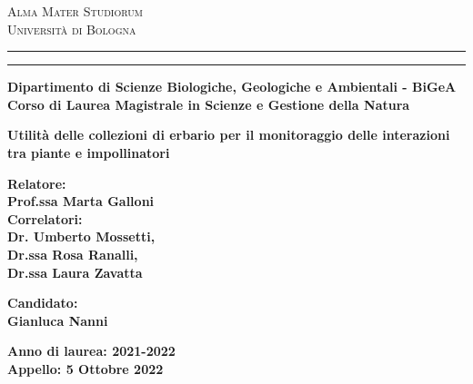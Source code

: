 \documentclass[a4paper,12pt]{article}
\begin{document}
\begin{titlepage}
\begin{center}
{{\Large{\textsc{Alma Mater Studiorum
\\
\medskip
Universit\`a di Bologna}}}} 
\rule[0.1cm]{14cm}{0.1mm}
\rule[0.5cm]{14cm}{0.6mm}
{\small{\bf Dipartimento di Scienze Biologiche, Geologiche e Ambientali - BiGeA\\
Corso di Laurea Magistrale in Scienze e Gestione della Natura}}
\end{center}
\vspace{30mm}
\begin{center}
{\LARGE{\bf Utilità delle collezioni di erbario per il monitoraggio delle interazioni tra piante e impollinatori}}\\
\vspace{3mm}
\end{center}
\vspace{40mm}
\par
\noindent
\begin{minipage}[t]{0.47\textwidth}
{\normalsize{\bf Relatore:\\
Prof.ssa Marta Galloni}}\vspace{0.5cm}\\
{\normalsize{\bf Correlatori:\\
Dr. Umberto Mossetti, \\Dr.ssa Rosa Ranalli, \\Dr.ssa Laura Zavatta}}
\end{minipage}
\hfill
\begin{minipage}[t]{0.47\textwidth}\raggedleft
{\normalsize{\bf Candidato:\\
Gianluca Nanni}}
\end{minipage}
\vspace{30mm}
\begin{center}
{\normalsize{\bf Anno di laurea: 2021-2022\\
Appello: 5 Ottobre 2022 }}
\end{center}
\end{titlepage}

\clearpage
\null
\thispagestyle{empty}
\clearpage

\tableofcontents
\thispagestyle{empty} %
\clearpage

\clearpage
\null
\thispagestyle{empty}
\clearpage
















\end{document}
